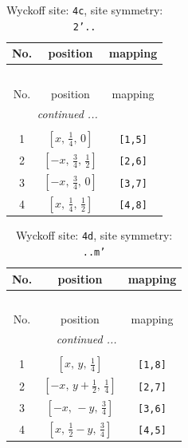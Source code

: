 \documentclass[fleqn,8pt]{jsarticle}
\begin{document}
\renewcommand{\arraystretch}{1.2}
\begin{longtable}{ccc}
\caption{Wyckoff site: {\tt 4c}, site symmetry: {\tt 2'..}}
 \\
 \hline \hline
No. & position & mapping \\ \hline \endfirsthead

\multicolumn{2}{l}{\tablename\ \thetable{}} \\
 \hline \hline
No. & position & mapping \\ \hline \endhead

 \hline \hline
\multicolumn{2}{r}{\footnotesize\it continued ...} \\ \endfoot

 \hline \hline
\multicolumn{2}{r}{} \\ \endlastfoot

1 & $\left[ x,\, \frac{1}{4},\, 0 \right]$ & {\tt [1,5]} \\ \hline
2 & $\left[ - x,\, \frac{3}{4},\, \frac{1}{2} \right]$ & {\tt [2,6]} \\ \hline
3 & $\left[ - x,\, \frac{3}{4},\, 0 \right]$ & {\tt [3,7]} \\ \hline
4 & $\left[ x,\, \frac{1}{4},\, \frac{1}{2} \right]$ & {\tt [4,8]} \\
\end{longtable}
\renewcommand{\arraystretch}{1.2}
\begin{longtable}{ccc}
\caption{Wyckoff site: {\tt 4d}, site symmetry: {\tt ..m'}}
 \\
 \hline \hline
No. & position & mapping \\ \hline \endfirsthead

\multicolumn{2}{l}{\tablename\ \thetable{}} \\
 \hline \hline
No. & position & mapping \\ \hline \endhead

 \hline \hline
\multicolumn{2}{r}{\footnotesize\it continued ...} \\ \endfoot

 \hline \hline
\multicolumn{2}{r}{} \\ \endlastfoot

1 & $\left[ x,\, y,\, \frac{1}{4} \right]$ & {\tt [1,8]} \\ \hline
2 & $\left[ - x,\, y + \frac{1}{2},\, \frac{1}{4} \right]$ & {\tt [2,7]} \\ \hline
3 & $\left[ - x,\, - y,\, \frac{3}{4} \right]$ & {\tt [3,6]} \\ \hline
4 & $\left[ x,\, \frac{1}{2} - y,\, \frac{3}{4} \right]$ & {\tt [4,5]} \\
\end{longtable}
\end{document}
